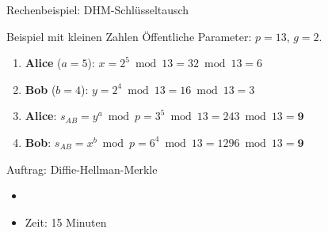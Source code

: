 \begin{frame}{Rechenbeispiel: DHM-Schlüsseltausch}
	\begin{exampleblock}{Beispiel mit kleinen Zahlen}
		Öffentliche Parameter: $p = 13$, $g = 2$.
		
		\begin{enumerate}[<+->]
			\item \textbf{Alice} ($a = 5$):
			      $x = 2^5 \bmod 13 = 32 \bmod 13 = 6$
			\item \textbf{Bob} ($b = 4$):
			      $y = 2^4 \bmod 13 = 16 \bmod 13 = 3$
			\item \textbf{Alice}:
			      $s_{AB} = y^a \bmod p = 3^5 \bmod 13 = 243 \bmod 13 = \mathbf{9}$
			\item \textbf{Bob}:
			      $s_{AB} = x^b \bmod p = 6^4 \bmod 13 = 1296 \bmod 13 = \mathbf{9}$
		\end{enumerate}
	\end{exampleblock}
\end{frame}

\begin{frame}{Auftrag: Diffie-Hellman-Merkle}
	\begin{itemize}
		\item {}
		\item Zeit: 15 Minuten
	\end{itemize}
\end{frame}
